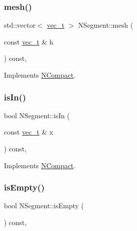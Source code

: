 \mbox{\label{class_n_segment_ad89a4122b800b15f465f5ca776394721}} 
\subsubsection{\texorpdfstring{mesh()}{mesh()}\hspace{0.1cm}{\footnotesize\ttfamily [2/2]}}
{\footnotesize\ttfamily std\+::vector$<$ \mbox{\hyperlink{group___n_algebra_ga0a2cfc67e738a3d73e4f12098c4c07f6}{vec\+\_\+t}} $>$ N\+Segment\+::mesh (\begin{DoxyParamCaption}\item[{const \mbox{\hyperlink{group___n_algebra_ga0a2cfc67e738a3d73e4f12098c4c07f6}{vec\+\_\+t}} \&}]{h }\end{DoxyParamCaption}) const\hspace{0.3cm}{\ttfamily [override]}, {\ttfamily [virtual]}}



Implements \mbox{\hyperlink{class_n_compact_ad4cdc60c75ca433c63f44ec13063e2fe}{N\+Compact}}.

\mbox{\label{class_n_segment_a9370351370e57d265f990b3e9d2ab114}} 
\subsubsection{\texorpdfstring{isIn()}{isIn()}}
{\footnotesize\ttfamily bool N\+Segment\+::is\+In (\begin{DoxyParamCaption}\item[{const \mbox{\hyperlink{group___n_algebra_ga0a2cfc67e738a3d73e4f12098c4c07f6}{vec\+\_\+t}} \&}]{x }\end{DoxyParamCaption}) const\hspace{0.3cm}{\ttfamily [override]}, {\ttfamily [virtual]}}



Implements \mbox{\hyperlink{class_n_compact_a387e86914973c69b292782f640368680}{N\+Compact}}.

\mbox{\label{class_n_segment_ac17e9542c20477269bbcf08286d79d07}} 
\subsubsection{\texorpdfstring{isEmpty()}{isEmpty()}}
{\footnotesize\ttfamily bool N\+Segment\+::is\+Empty (\begin{DoxyParamCaption}{ }\end{DoxyParamCaption}) const\hspace{0.3cm}{\ttfamily [override]}, {\ttfamily [virtual]}}



